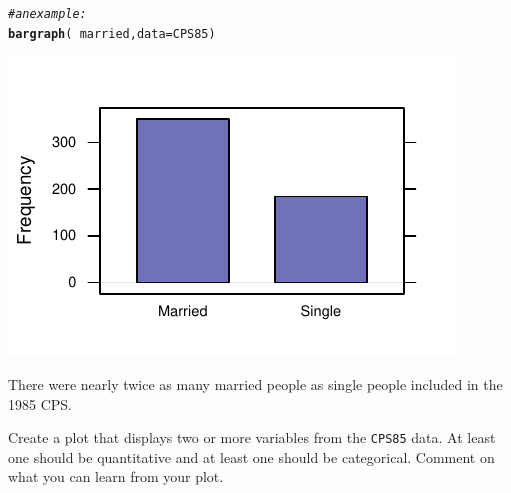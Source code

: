 \documentclass[twoside]{book}\usepackage[]{graphicx}\usepackage[]{xcolor}
\makeatletter
\def\maxwidth{ %
  \ifdim\Gin@nat@width>\linewidth
    \linewidth
  \else
    \Gin@nat@width
  \fi
}
\newcommand{\hlcom}[1]{\textcolor[rgb]{0.678,0.584,0.686}{\textit{#1}}}%
\newcommand{\hlopt}[1]{\textcolor[rgb]{0,0,0}{#1}}%
\newcommand{\hlstd}[1]{\textcolor[rgb]{0.345,0.345,0.345}{#1}}%
\newcommand{\hlkwc}[1]{\textcolor[rgb]{0.333,0.667,0.333}{#1}}%
\newcommand{\hlkwd}[1]{\textcolor[rgb]{0.737,0.353,0.396}{\textbf{#1}}}%
\newenvironment{kframe}{%
 \def\at@end@of@kframe{}%
 \ifinner\ifhmode%
  \def\at@end@of@kframe{\end{minipage}}%
  \begin{minipage}{\columnwidth}%
 \fi\fi%
 \def\FrameCommand##1{\hskip\@totalleftmargin \hskip-\fboxsep
 \colorbox{shadecolor}{##1}\hskip-\fboxsep
     \hskip-\linewidth \hskip-\@totalleftmargin \hskip\columnwidth}%
 \MakeFramed {\advance\hsize-\width
   \@totalleftmargin\z@ \linewidth\hsize
   \@setminipage}}%
 {\par\unskip\endMakeFramed%
 \at@end@of@kframe}
\newenvironment{knitrout}{}{} %
\newcommand{\Rindex}[1]{\index{\texttt{#1}}}
\newcommand{\dataframe}[1]{{\color{blue!80!black}\texttt{#1}}\Rindex{#1}}
\newcounter{example}[section]
\makeatother
\begin{document}
\begin{solution}
\begin{knitrout}
\color{fgcolor}\begin{kframe}
\begin{alltt}
\hlcom{# an example:}
\hlkwd{bargraph}\hlstd{(}\hlopt{~}\hlstd{married,} \hlkwc{data} \hlstd{= CPS85)}
\end{alltt}
\end{kframe}

{\centering \includegraphics[width=\maxwidth]{figures/fig-unnamed-chunk-23-1} 

}



\end{knitrout}
There were nearly twice as many married people as single people included in the 1985 CPS. 
\end{solution}


\begin{problem}
	Create a plot that displays two or more variables from the 
	\dataframe{CPS85} data.  At least one should be quantitative 
	and at least one should be categorical.
	Comment on what you can learn from your plot.
\end{problem}
\end{document}
